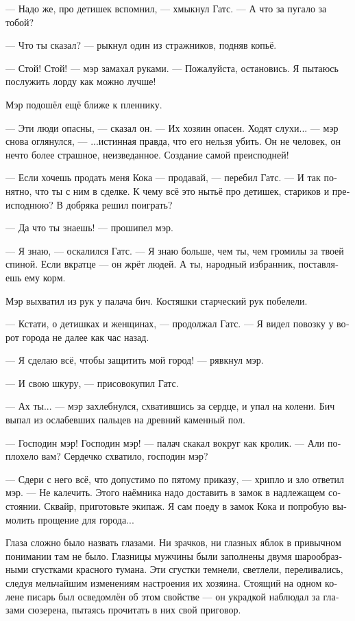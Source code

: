 \documentclass[a4paper,12pt,fleqn]{book}\usepackage{polyglossia}\setdefaultlanguage[babelshorthands=true]{russian}\setotherlanguage{english}\defaultfontfeatures{Ligatures=TeX,Mapping=tex-text}\usepackage{xcolor}\newcommand{\ml}[3]{#2}
\newcommand{\asterism}{\vspace{1em}{\centering\Large\bfseries$\ast~\ast~\ast$\par}\vspace{1em}}
\begin{document}
--- Надо же, про детишек вспомнил, --- хмыкнул Гатс.
--- А что за пугало за тобой?

--- Что ты сказал? --- рыкнул один из стражников, подняв копьё.

--- Стой!
Стой! --- мэр замахал руками.
--- Пожалуйста, остановись.
Я пытаюсь послужить лорду как можно лучше!

Мэр подошёл ещё ближе к пленнику.

--- Эти люди опасны, --- сказал он.
--- Их хозяин опасен.
Ходят слухи... --- мэр снова оглянулся, --- ...истинная правда, что его нельзя убить.
Он не человек, он нечто более страшное, неизведанное.
Создание самой преисподней!

--- Если хочешь продать меня Кока --- продавай, --- перебил Гатс.
--- И так понятно, что ты с ним в сделке.
К чему всё это нытьё про детишек, стариков и преисподнюю?
В добряка решил поиграть?

--- Да что ты знаешь! --- прошипел мэр.

--- Я знаю, --- оскалился Гатс.
--- Я знаю больше, чем ты, чем громилы за твоей спиной.
Если вкратце --- он жрёт людей.
А ты, народный избранник, поставляешь ему корм.

Мэр выхватил из рук у палача бич.
Костяшки старческий рук побелели.

--- Кстати, о детишках и женщинах, --- продолжал Гатс.
--- Я видел повозку у ворот города не далее как час назад.

--- Я сделаю всё, чтобы защитить мой город! --- рявкнул мэр.

--- И свою шкуру, --- присовокупил Гатс.

--- Ах ты... --- мэр захлебнулся, схватившись за сердце, и упал на колени.
Бич выпал из ослабевших пальцев на древний каменный пол.

--- Господин мэр!
Господин мэр! --- палач скакал вокруг как кролик.
--- Али поплохело вам?
Сердечко схватило, господин мэр?

--- Сдери с него всё, что допустимо по пятому приказу, --- хрипло и зло ответил мэр.
--- Не калечить.
Этого наёмника надо доставить в замок в надлежащем состоянии.
Сквайр, приготовьте экипаж.
Я сам поеду в замок Кока и попробую вымолить прощение для города...

\asterism

Глаза сложно было назвать глазами.
Ни зрачков, ни глазных яблок в привычном понимании там не было.
Глазницы мужчины были заполнены двумя шарообразными сгустками красного тумана.
Эти сгустки темнели, светлели, переливались, следуя мельчайшим изменениям настроения их хозяина.
Стоящий на одном колене писарь был осведомлён об этом свойстве --- он украдкой наблюдал за глазами сюзерена, пытаясь прочитать в них свой приговор.
\end{document}
